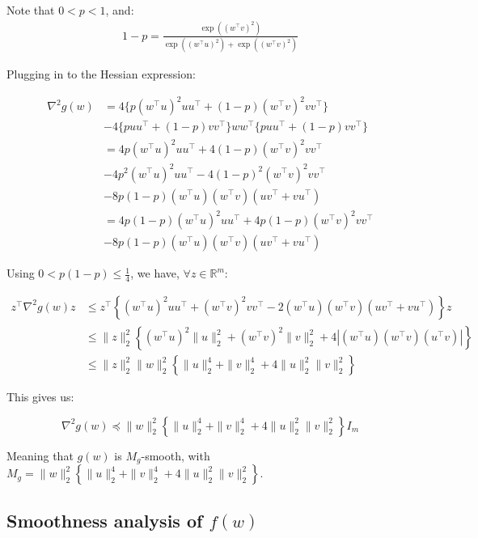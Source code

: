 \documentclass[11pt]{article}
\begin{document}
Note that $0 < p < 1$, and:
\begin{align*}
1 - p = \frac{\exp((w^{\top}v)^2)}{ \exp((w^{\top}u)^2) + \exp((w^{\top}v)^2) }
\end{align*}

Plugging in to the Hessian expression:

\begin{align*}
    \nabla^2 g(w) &= 
    4 \{ p(w^{\top}u)^2 uu^{\top} + (1-p)(w^{\top}v)^2 vv^{\top} \} \\
    &- 4 \{ p uu^{\top} + (1-p) vv^{\top} \}ww^{\top}\{ p uu^{\top} + (1-p) vv^{\top} \} \\
    &= 4 p(w^{\top}u)^2 uu^{\top} + 4 (1-p)(w^{\top}v)^2 vv^{\top} \\
    &- 4 p^2 (w^{\top}u)^2 uu^{\top} - 4 (1-p)^2 (w^{\top}v)^2 vv^{\top} \\
    &- 8 p (1-p) (w^{\top}u)(w^{\top}v)(uv^{\top} + vu^{\top}) \\
    &= 4 p (1 - p) (w^{\top}u)^2 uu^{\top} + 4 p (1-p) (w^{\top}v)^2 vv^{\top} \\
    &- 8 p (1-p) (w^{\top}u)(w^{\top}v)(uv^{\top} + vu^{\top})
\end{align*}

Using $0 < p(1-p) \leq \frac{1}{4}$, we have, $\forall z \in \mathbb{R}^m$:

\begin{align*}
    z^{\top} \nabla^2 g(w) z &\leq
    z^{\top} \left\{ (w^{\top}u)^2 uu^{\top} + (w^{\top}v)^2 vv^{\top} - 2 (w^{\top}u)(w^{\top}v)(uv^{\top} + vu^{\top}) \right\} z \\
    &\leq \|z\|_2^2 \left\{ (w^{\top}u)^2 \|u\|_2^2 + (w^{\top}v)^2 \|v\|_2^2 + 4 \left| (w^{\top}u)(w^{\top}v)(u^{\top}v) \right| \right\} \\
    &\leq \|z\|_2^2 \|w\|_2^2 \left\{ \|u\|_2^4 + \|v\|_2^4 + 4 \|u\|_2^2 \|v\|_2^2 \right\}
\end{align*}

This gives us:

\begin{equation}
    \nabla^2 g(w) \preceq \|w\|_2^2 \left\{ \|u\|_2^4 + \|v\|_2^4 + 4 \|u\|_2^2 \|v\|_2^2 \right\} I_m
\end{equation}

Meaning that $g(w)$ is $M_g$-smooth, with $M_g = \|w\|_2^2 \left\{ \|u\|_2^4 + \|v\|_2^4 + 4 \|u\|_2^2 \|v\|_2^2 \right\}$.

\subsection{Smoothness analysis of $f(w)$}
\end{document}
